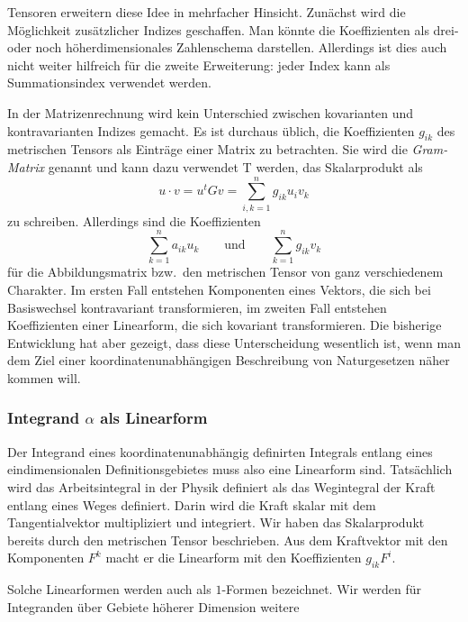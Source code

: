 Tensoren erweitern diese Idee in mehrfacher Hinsicht.
Zunächst wird die Möglichkeit zusätzlicher Indizes geschaffen.
Man könnte die Koeffizienten als drei- oder noch höherdimensionales
Zahlenschema darstellen.
Allerdings ist dies auch nicht weiter hilfreich für die zweite
Erweiterung: jeder Index kann als Summationsindex verwendet werden.

In der Matrizenrechnung wird kein Unterschied zwischen kovarianten
und kontravarianten Indizes gemacht.
Es ist durchaus üblich, die Koeffizienten $g_{ik}$ des metrischen
Tensors als Einträge einer Matrix zu betrachten.
Sie wird die {\em Gram-Matrix} genannt und kann dazu verwendet
T
werden, das Skalarprodukt als 
\[
u\cdot v
=
u^t G v
=
\sum_{i,k=1}^n
g_{ik}u_iv_k
\]
zu schreiben.
Allerdings sind die Koeffizienten
\[
\sum_{k=1}^n a_{ik}u_k
\qquad\text{und}\qquad
\sum_{k=1}^n g_{ik}v_k
\]
für die Abbildungsmatrix bzw.~den metrischen Tensor von ganz verschiedenem
Charakter.
Im ersten Fall entstehen Komponenten eines Vektors, die sich bei Basiswechsel
kontravariant transformieren, im zweiten Fall entstehen Koeffizienten
einer Linearform, die sich kovariant transformieren.
Die bisherige Entwicklung hat aber gezeigt, dass diese Unterscheidung
wesentlich ist, wenn man dem Ziel einer koordinatenunabhängigen
Beschreibung von Naturgesetzen näher kommen will.

%
%
\subsubsection{Integrand $\alpha$ als Linearform}
Der Integrand eines koordinatenunabhängig definirten Integrals entlang
eines eindimensionalen Definitionsgebietes muss also eine
Linearform sind.
Tatsächlich wird das Arbeitsintegral in der Physik definiert als
das Wegintegral der Kraft entlang eines Weges definiert.
Darin wird die Kraft skalar mit dem Tangentialvektor multipliziert
und integriert.
Wir haben das Skalarprodukt bereits durch den metrischen Tensor
beschrieben.
Aus dem Kraftvektor mit den Komponenten $F^k$ macht er die Linearform
mit den Koeffizienten $g_{ik}F^i$.

Solche Linearformen werden auch als $1$-Formen bezeichnet.
Wir werden für Integranden über Gebiete höherer Dimension weitere

%
%
